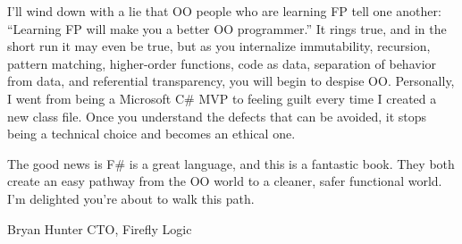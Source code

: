\documentclass{book}
\begin{document}
I’ll wind down with a lie that OO people who are learning FP tell one another: “Learning FP will make you a better OO programmer.” It rings true, and in the short run it may even be true, but as you internalize immutability, recursion, pattern matching, higher-order functions, code as data, separation of behavior from data, and referential transparency, you will begin to despise OO. Personally, I went from being a Microsoft C\# MVP to feeling guilt every time I created a new class file. Once you understand the defects that can be avoided, it stops being a technical choice and becomes an ethical one.

The good news is F\# is a great language, and this is a fantastic book. They both create an easy pathway from the OO world to a cleaner, safer functional world. I’m delighted you’re about to walk this path.

Bryan Hunter
CTO, Firefly Logic
\end{document}
